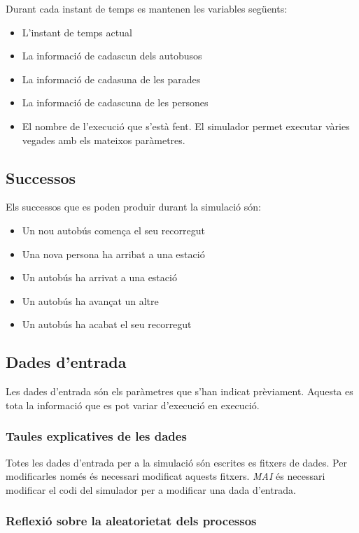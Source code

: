 \documentclass[a4paper,10pt]{article}
\begin{document}
Durant cada instant de temps es mantenen les variables següents:
\begin{itemize}
 \item L'instant de temps actual
 \item La informació de cadascun dels autobusos
 \item La informació de cadasuna de les parades
 \item La informació de cadascuna de les persones
 \item El nombre de l'execució que s'està fent. El simulador permet executar vàries vegades amb els mateixos paràmetres.
\end{itemize}


\subsection{Successos}

Els successos que es poden produir durant la simulació són:
\begin{itemize}
 \item Un nou autobús comença el seu recorregut
 \item Una nova persona ha arribat a una estació
 \item Un autobús ha arrivat a una estació
 \item Un autobús ha avançat un altre
 \item Un autobús ha acabat el seu recorregut
\end{itemize}


\subsection{Dades d'entrada}

Les dades d'entrada són els paràmetres que s'han indicat prèviament. Aquesta es tota la informació que es pot variar d'execució en execució.

\subsubsection{Taules explicatives de les dades}

Totes les dades d'entrada per a la simulació són escrites es fitxers de dades. Per modificarles només és necessari modificat aquests fitxers. \emph{MAI} és necessari modificar el codi del simulador per a modificar una dada d'entrada.


\subsubsection{Reflexió sobre la aleatorietat dels processos}
\end{document}
